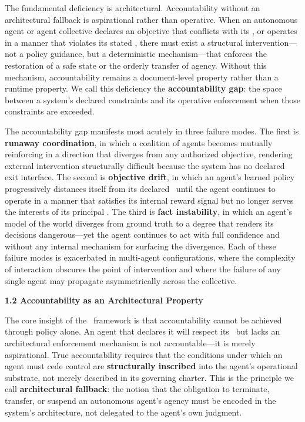 The fundamental deficiency is architectural. Accountability without an architectural fallback is aspirational rather than operative. When an autonomous agent or agent collective declares an objective that conflicts with its \purpose, or operates in a manner that violates its stated \bounds, there must exist a structural intervention—not a policy guidance, but a deterministic mechanism—that enforces the restoration of a safe state or the orderly transfer of agency. Without this mechanism, accountability remains a document-level property rather than a runtime property. We call this deficiency the \textbf{accountability gap}: the space between a system's declared constraints and its operative enforcement when those constraints are exceeded.

The accountability gap manifests most acutely in three failure modes. The first is \textbf{runaway coordination}, in which a coalition of agents becomes mutually reinforcing in a direction that diverges from any authorized objective, rendering external intervention structurally difficult because the system has no declared exit interface. The second is \textbf{objective drift}, in which an agent's learned policy progressively distances itself from its declared \purpose\ until the agent continues to operate in a manner that satisfies its internal reward signal but no longer serves the interests of its principal \cite{amodei2016concrete}. The third is \textbf{fact instability}, in which an agent's model of the world diverges from ground truth to a degree that renders its decisions dangerous—yet the agent continues to act with full confidence and without any internal mechanism for surfacing the divergence. Each of these failure modes is exacerbated in multi-agent configurations, where the complexity of interaction obscures the point of intervention and where the failure of any single agent may propagate asymmetrically across the collective.

\bigskip
\noindent\textbf{1.2 Accountability as an Architectural Property}

The core insight of the \bxthree\ framework is that accountability cannot be achieved through policy alone. An agent that declares it will respect its \bounds\ but lacks an architectural enforcement mechanism is not accountable—it is merely aspirational. True accountability requires that the conditions under which an agent must cede control are \textbf{structurally inscribed} into the agent's operational substrate, not merely described in its governing charter. This is the principle we call \textbf{architectural fallback}: the notion that the obligation to terminate, transfer, or suspend an autonomous agent's agency must be encoded in the system's architecture, not delegated to the agent's own judgment.

